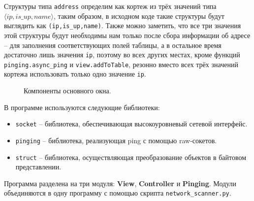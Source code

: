 \documentclass[a4paper]{article}
\begin{document}
		Структуры типа \texttt{address} определим как кортеж из трёх значений типа $\langle ip, is\_up, name \rangle$, таким образом, в исходном коде такие структуры будут выглядить как \texttt{(ip,is\_up,name)}. Также можно заметить, что все три значения этой структуры будут необходимы нам только после сбора информации об адресе -- для заполнения соответствующих полей таблицы, а в остальное время достаточно лишь значения \texttt{ip}, поэтому во всех других местах, кроме функций \texttt{pinging.async\_ping} и \texttt{view.addToTable}, резонно вместо всех трёх значений кортежа использовать только одно значение \texttt{ip}.
		
		\clearpage
	
		\begin{figure}[h]
			\caption{Компоненты основного окна.}
		\end{figure}
	
		В программе используются следующие библиотеки:

		\begin{itemize}
			\item
				\texttt{socket} -- библиотека, обеспечивающая высокоуровневый сетевой интерфейс.
			\item
				\texttt{pinging} -- библиотека, реализующая ping с помощью raw-сокетов.
			\item
				\texttt{struct} -- библиотека, осуществляющая преобразование объектов в байтовом представлении.
		\end{itemize}
		
		Программа разделена на три модуля: \textbf{View}, \textbf{Controller} и \textbf{Pinging}. Модули объединяются в одну программу с помощью скрипта \texttt{network\_scanner.py}.
		
\end{document}
